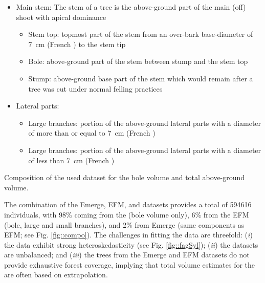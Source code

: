 \begin{itemize}
	\item Main stem: The stem of a tree is the above-ground part of the main (off) shoot with apical dominance
	\begin{itemize}
		\item Stem top: topmost part of the stem from an over-bark base-diameter of \qty{7}{\centi\metre} (French \NFI) to the stem tip
		\item Bole: above-ground part of the stem between stump and the stem top
		\item Stump: above-ground base part of the stem which would remain after a tree was cut under normal felling practices
	\end{itemize}
	\item Lateral parts:
	\begin{itemize}
		\item Large branches: portion of the above-ground lateral parts with a diameter of more than or equal to \qty{7}{\centi\metre} (French \NFI)
		\item Large branches: portion of the above-ground lateral parts with a diameter of less than \qty{7}{\centi\metre} (French \NFI)
	\end{itemize}
\end{itemize}

\begin{marginfigure}
	\centering
	
	\caption{Composition of the used dataset for the bole volume and total above-ground volume.\label{fig::compo}}
\end{marginfigure}
The combination of the Emerge, EFM, and \NFI{} datasets provides a total of \num{594616} individuals, with 98\% coming from the \NFI{} (bole volume only), 6\% from the EFM (bole, large and small branches), and 2\% from Emerge (same components as EFM; see Fig. \ref{fig::compo}). The challenges in fitting the data are threefold: (\textit{i}) the data exhibit strong heteroskedasticity (see Fig. \ref{fig::fagSyl}); (\textit{ii}) the datasets are unbalanced; and (\textit{iii}) the trees from the Emerge and EFM datasets do not provide exhaustive forest coverage, implying that total volume estimates for the \NFI{} are often based on extrapolation.

